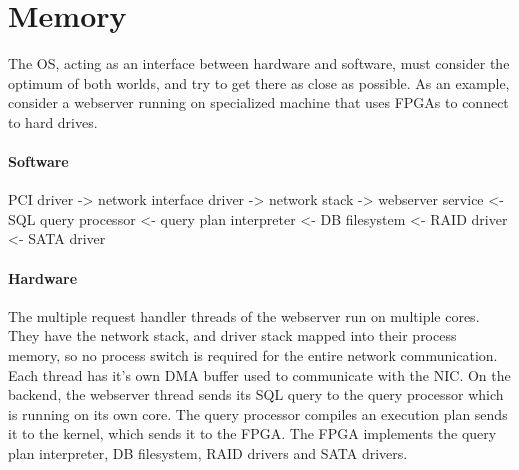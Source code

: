 \documentclass[a4paper]{article}
\begin{document}
\section{Memory}

The OS, acting as an interface between hardware and software, must consider the optimum of both worlds, and try to get there as close as possible. As an example, consider a webserver running on specialized machine that uses FPGAs to connect to hard drives.

\paragraph{Software}
PCI driver -> network interface driver -> network stack -> webserver service <- SQL query processor <- query plan interpreter <- DB filesystem <- RAID driver <- SATA driver

\paragraph{Hardware}
The multiple request handler threads of the webserver run on multiple cores. They have the network stack, and driver stack mapped into their process memory, so no process switch is required for the entire network communication. Each thread has it's own DMA buffer used to communicate with the NIC. On the backend, the webserver thread sends its SQL query to the query processor which is running on its own core. The query processor compiles an execution plan sends it to the kernel, which sends it to the FPGA. The FPGA implements the query plan interpreter, DB filesystem, RAID drivers and SATA drivers.
\end{document}

